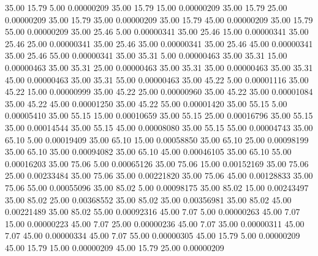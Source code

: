      35.00     15.79      5.00     0.00000209
     35.00     15.79     15.00     0.00000209
     35.00     15.79     25.00     0.00000209
     35.00     15.79     35.00     0.00000209
     35.00     15.79     45.00     0.00000209
     35.00     15.79     55.00     0.00000209
     35.00     25.46      5.00     0.00000341
     35.00     25.46     15.00     0.00000341
     35.00     25.46     25.00     0.00000341
     35.00     25.46     35.00     0.00000341
     35.00     25.46     45.00     0.00000341
     35.00     25.46     55.00     0.00000341
     35.00     35.31      5.00     0.00000463
     35.00     35.31     15.00     0.00000463
     35.00     35.31     25.00     0.00000463
     35.00     35.31     35.00     0.00000463
     35.00     35.31     45.00     0.00000463
     35.00     35.31     55.00     0.00000463
     35.00     45.22      5.00     0.00001116
     35.00     45.22     15.00     0.00000999
     35.00     45.22     25.00     0.00000960
     35.00     45.22     35.00     0.00001084
     35.00     45.22     45.00     0.00001250
     35.00     45.22     55.00     0.00001420
     35.00     55.15      5.00     0.00005410
     35.00     55.15     15.00     0.00010659
     35.00     55.15     25.00     0.00016796
     35.00     55.15     35.00     0.00014544
     35.00     55.15     45.00     0.00008080
     35.00     55.15     55.00     0.00004743
     35.00     65.10      5.00     0.00019409
     35.00     65.10     15.00     0.00058850
     35.00     65.10     25.00     0.00098199
     35.00     65.10     35.00     0.00094082
     35.00     65.10     45.00     0.00046105
     35.00     65.10     55.00     0.00016203
     35.00     75.06      5.00     0.00065126
     35.00     75.06     15.00     0.00152169
     35.00     75.06     25.00     0.00233484
     35.00     75.06     35.00     0.00221820
     35.00     75.06     45.00     0.00128833
     35.00     75.06     55.00     0.00055096
     35.00     85.02      5.00     0.00098175
     35.00     85.02     15.00     0.00243497
     35.00     85.02     25.00     0.00368552
     35.00     85.02     35.00     0.00356981
     35.00     85.02     45.00     0.00221489
     35.00     85.02     55.00     0.00092316
     45.00      7.07      5.00     0.00000263
     45.00      7.07     15.00     0.00000223
     45.00      7.07     25.00     0.00000236
     45.00      7.07     35.00     0.00000311
     45.00      7.07     45.00     0.00000334
     45.00      7.07     55.00     0.00000305
     45.00     15.79      5.00     0.00000209
     45.00     15.79     15.00     0.00000209
     45.00     15.79     25.00     0.00000209
